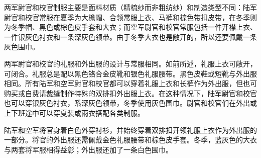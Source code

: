 两军尉官和校官制服主要是面料材质（精梳纱而非粗纺纱）和制造类型不同：陆军尉官和校官常服在夏季为大檐帽、合领常服上衣、马裤和棕色带扣皮带，在冬季则为冬季帽、黑色或棕色皮手套和大衣；而空军尉官和校官常服包括一件开襟上衣、一件银灰色衬衣和一条深灰色领带。由于冬季大衣也是敞开的，所以还要佩戴一条灰色围巾。

两军尉官和校官的礼服和外出服的设计与常服相同。如前所述，礼服上衣可敞开，可闭合。礼服总是配以黑色铬合金皮靴和银色礼服腰带。黑色皮鞋或短靴与外出服相同。所有陆军和空军尉官和校官都可以穿着礼服上衣和长裤作为外出服，但也可购买或自费请裁缝制作特殊的双排扣外出服上衣。在这种情况下，陆军尉官和校官也可以穿银灰色衬衣，系深灰色领带，冬季使用灰色围巾。尉官和校官们在外出或上下班途中可以穿夏装或雨衣搭配各类制服。

陆军和空军将官身着白色外穿衬衫，并始终穿着双排扣开领礼服上衣作为外出服的一部分。将官的外出服还需佩戴金色礼服腰带和棕色皮手套。冬季，蓝灰色的大衣与两套将军服相得益彰；外出服还加了一条白色围巾。

